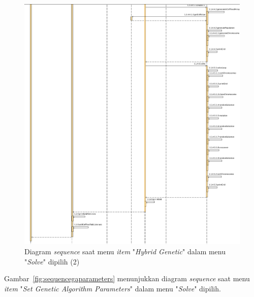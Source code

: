 \begin{figure}
\centering
\captionsetup{justification=centering}
\includegraphics[scale=0.333]{Gambar/Analisis/SequenceDiagramHybridGenetic2.png}
\caption[Diagram \textit{sequence} saat menu \textit{item} "\textit{Hybrid Genetic}" dalam menu "\textit{Solve}" dipilih (2)]{Diagram \textit{sequence} saat menu \textit{item} "\textit{Hybrid Genetic}" dalam menu "\textit{Solve}" dipilih (2)}
\label{fig:sequencehg2}
\end{figure}


Gambar~\ref{fig:sequencegaparameters} menunjukkan diagram \textit{sequence} saat menu \textit{item} "\textit{Set Genetic Algorithm Parameters}" dalam menu "\textit{Solve}" dipilih.

